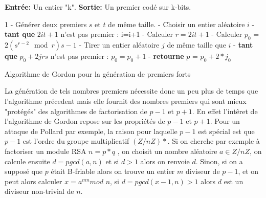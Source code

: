 \documentclass[a4paper,11pt]{article}
\renewcommand{\algorithmicreturn}{\textbf{retourne}}
\renewcommand{\algorithmicrequire}{\textbf{Entrée:}}
\renewcommand{\algorithmicensure}{\textbf{Sortie:}}
\renewcommand{\algorithmicwhile}{\textbf{tant que}}
\begin{document}
\begin{algorithm}[H]
\SetAlgoLined


\algorithmicrequire{ Un entier "k".}\newline
\algorithmicensure{ Un premier codé sur k-bits.}\newline

 1 - Générer deux premiers $s$ et $t$ de même taille. - Choisir un entier aléatoire $i$  - \algorithmicwhile{ $2it+1$ n'est pas premier : }\newline
\hspace*{15mm} i=i+1 - Calculer $r = 2it+1$  - Calculer $ p_{0}$ = $ 2 ( s^{r-2} \mod r )s - 1$  - Tirer un entier aléatoire $j$ de même taille que $i$  - \algorithmicwhile{ $p_{0} + 2jrs $ n'est pas premier : }\newline
 \hspace*{15mm} $p_{0}=p_{0}+1$ - \algorithmicreturn{ $p$ = $p_{0} + 2 * j_{0}$}
 
 
 
 \caption{Algorithme de Gordon pour la génération de premiers forts}
\end{algorithm}


    La génération de tels nombres premiers nécessite donc un peu plus de temps que l'algorithme précedent mais elle fournit des nombres premiers qui sont mieux "protégés" des algorithmes de factorisation de $p-1$ et $p+1$.
    En effet l'intêret de l'algorithme de Gordon repose sur les propriétés de $p-1$ et $p+1$. \newline
    Pour un attaque de Pollard par exemple, la raison pour laquelle $p-1$ est spécial est que $p-1$ est l'ordre du groupe multiplicatif $(Z/nZ)*$. Si on cherche par exemple à factoriser un module RSA $n = p*q $ , on choisit un nombre aléatoire $a \in Z/nZ$, on calcule ensuite $d = pgcd(a,n)$ et si $d > 1$ alors on renvoie $d$.  Sinon, si on a supposé que $p$ était B-friable alors on trouve un entier $m$ diviseur de $p-1$, et on peut alors calculer $x = a^{mn} mod $ $n $, si $d = pgcd(x-1,n) > 1$ alors $d$ est un diviseur non-trivial de $n$.
\end{document}

